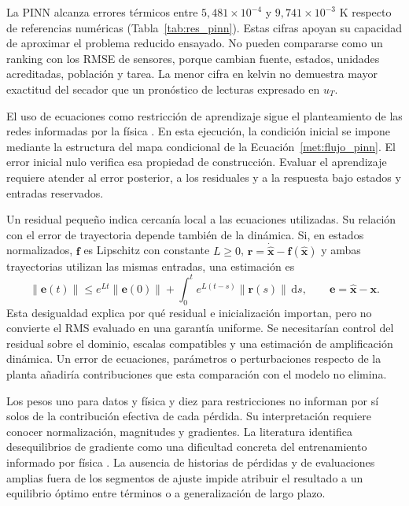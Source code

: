 La PINN alcanza errores térmicos entre $5{,}481\times10^{-4}$ y $9{,}741\times10^{-3}$ K respecto de referencias numéricas (Tabla~\ref{tab:res_pinn}). Estas cifras apoyan su capacidad de aproximar el problema reducido ensayado. No pueden compararse como un ranking con los RMSE de sensores, porque cambian fuente, estados, unidades acreditadas, población y tarea. La menor cifra en kelvin no demuestra mayor exactitud del secador que un pronóstico de lecturas expresado en $u_T$.

El uso de ecuaciones como restricción de aprendizaje sigue el planteamiento de las redes informadas por la física \cite{raissi2019}. En esta ejecución, la condición inicial se impone mediante la estructura del mapa condicional de la Ecuación~\eqref{met:flujo_pinn}. El error inicial nulo verifica esa propiedad de construcción. Evaluar el aprendizaje requiere atender al error posterior, a los residuales y a la respuesta bajo estados y entradas reservados.

Un residual pequeño indica cercanía local a las ecuaciones utilizadas. Su relación con el error de trayectoria depende también de la dinámica. Si, en estados normalizados, $\mathbf f$ es Lipschitz con constante $L\geq0$, $\mathbf r=\dot{\widehat{\mathbf x}}-\mathbf f(\widehat{\mathbf x})$ y ambas trayectorias utilizan las mismas entradas, una estimación es
\begin{equation}
\|\mathbf e(t)\|\leq
e^{Lt}\|\mathbf e(0)\|
+\int_0^t e^{L(t-s)}\|\mathbf r(s)\|\,\mathrm ds,
\qquad \mathbf e=\widehat{\mathbf x}-\mathbf x.
\label{eq:dis_error_pinn}
\end{equation}
Esta desigualdad explica por qué residual e inicialización importan, pero no convierte el RMS evaluado en una garantía uniforme. Se necesitarían control del residual sobre el dominio, escalas compatibles y una estimación de amplificación dinámica. Un error de ecuaciones, parámetros o perturbaciones respecto de la planta añadiría contribuciones que esta comparación con el modelo no elimina.

Los pesos uno para datos y física y diez para restricciones no informan por sí solos de la contribución efectiva de cada pérdida. Su interpretación requiere conocer normalización, magnitudes y gradientes. La literatura identifica desequilibrios de gradiente como una dificultad concreta del entrenamiento informado por física \cite{wang2021}. La ausencia de historias de pérdidas y de evaluaciones amplias fuera de los segmentos de ajuste impide atribuir el resultado a un equilibrio óptimo entre términos o a generalización de largo plazo.

